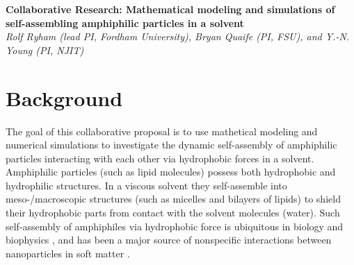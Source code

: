 \noindent
{\bf Collaborative Research: Mathematical modeling and simulations of
self-assembling amphiphilic particles in a solvent} \\
{\em Rolf Ryham (lead PI, Fordham University), Bryan Quaife (PI,
FSU), and Y.-N. Young (PI, NJIT)}
\section{Background}
\label{sec:background}
The goal of this collaborative proposal is to use mathetical modeling and
numerical simulations to investigate the dynamic self-assembly of
amphiphilic particles interacting with each other via hydrophobic forces
in a solvent. Amphiphilic particles (such as lipid molecules) possess
both hydrophobic and hydrophilic structures. In a viscous solvent they
self-assemble into meso-/macroscopic structures (such as micelles and
bilayers of lipids) to shield their hydrophobic parts from contact with
the solvent molecules (water).
%
%
Such self-assembly of amphiphiles via hydrophobic force is ubiquitous in biology and biophysics \cite{Israelachvili1954},
and has been a major source of nonspecific interactions between
nanoparticles in  soft matter
\cite{Sanchez-IglesiasEtAl2012_ACSNano,AltantzisEtAl2013_PSC,XieYangLuEtAl2020_COCIS}. 



